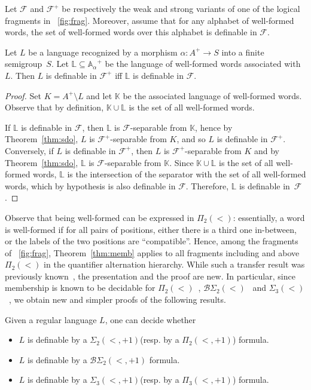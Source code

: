\documentclass[a4paper,USenglish]{lipics}
\newcommand\Abb{\ensuremath{\mathbb{A}}\xspace}
\newcommand\Lbb{\ensuremath{\mathbb{L}}\xspace}
\newcommand\Kbb{\ensuremath{\mathbb{K}}\xspace}
\newcommand\Fs{\ensuremath{\mathcal{F}}\xspace}
\newcommand{\sio}[1]{\ensuremath{\Sigma_{#1}(<)}\xspace}
\newcommand{\pio}[1]{\ensuremath{\Pi_{#1}(<)}\xspace}
\newcommand{\bso}[1]{\ensuremath{\mathcal{B}\Sigma_{#1}(<)}\xspace}
\newcommand{\sdp}{\ensuremath{\Sigma_{2}(<,+1)}\xspace}
\newcommand{\bdp}{\ensuremath{\mathcal{B}\Sigma_{2}(<,+1)}\xspace}
\newcommand{\stp}{\ensuremath{\Sigma_{3}(<,+1)}\xspace}
\newcommand{\pdp}{\ensuremath{\Pi_{2}(<,+1)}\xspace}
\newcommand{\ptp}{\ensuremath{\Pi_{3}(<,+1)}\xspace}
\newcommand\wfA{\ensuremath{\Abb_\alpha}\xspace}
\theoremstyle{plain}
\begin{document}
\begin{theorem} \label{thm:memb}
  Let \Fs and $\Fs^+$ be respectively the weak and strong variants of
  one of the logical fragments in \figurename~\ref{fig:frag}. Moreover,
  assume that for any alphabet of well-formed words, the set of
  well-formed words over this alphabet is definable in \Fs.

  Let $L$ be a language recognized by a morphism $\alpha: A^+ \rightarrow S$ into
  a finite semigroup~$S$. Let $\Lbb \subseteq\wfA^+$ be the language of
  well-formed words associated with $L$. Then $L$ is definable in $\Fs^+$ iff\/
  $\Lbb$ is definable in $\Fs$.
\end{theorem}

\begin{proof}
  Set $K = A^+ \setminus L$ and let \Kbb be the associated language of
  well-formed words. Observe that by definition, $\Kbb \cup \Lbb$ is the
  set of all well-formed words.

  If $\Lbb$ is definable in $\Fs$, then $\Lbb$ is $\Fs$-separable from \Kbb,
  hence by Theorem~\ref{thm:sdo}, $L$ is $\Fs^+$-separable from $K$, and so
  $L$ is definable in $\Fs^+$. Conversely, if $L$ is definable in
  $\Fs^+$, then $L$ is $\Fs^+$-separable from $K$ and by Theorem~\ref{thm:sdo},
  \Lbb is $\Fs$-separable from \Kbb. Since $\Kbb \cup \Lbb$ is
  the set of all well-formed words, \Lbb is the intersection of the
  separator with the set of all well-formed words, which by hypothesis is also definable in \Fs.
  Therefore, \Lbb is definable in~\Fs.
\end{proof}

Observe that being well-formed  can be expressed in \pio{2}:
essentially, a word is well-formed if for all pairs of positions,
either there is a third one in-between, or the labels of the two
positions are ``compatible''. Hence, among the fragments of
\figurename~\ref{fig:frag}, Theorem~\ref{thm:memb} applies to all
fragments including and above \pio{2} in the quantifier alternation
hierarchy. While such a transfer result was previously
known~\cite{Str85,pw:wreath}, the presentation and the proof are
new. In particular, since membership is known to be decidable for
\pio{2}~\cite{pwdelta}, \bso{2}~\cite{PZ:icalp14} and
\sio{3}~\cite{PZ:icalp14}, we obtain new and simpler proofs of the
following results.

\begin{corollary} \label{cor:memb}
  Given a regular language $L$, one can decide whether
  \begin{itemize}
  \item $L$ is definable by a \sdp (resp. by a \pdp) formula.
  \item $L$ is definable by a \bdp formula.
  \item $L$ is definable by a \stp (resp. by a \ptp) formula.
  \end{itemize}
\end{corollary}
\end{document}
